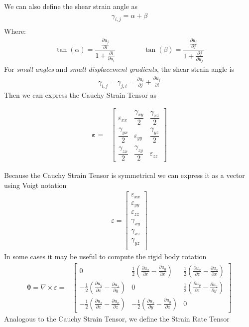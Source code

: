 \documentclass[a4paper, 11pt,article,oneside]{memoir}%
\begin{document}
We can also define the shear strain angle as
\begin{align*}
\gamma_{i,j}=\alpha+\beta\\
\end{align*} 
Where: 
\begin{align*}
\tan (\alpha)=\dfrac{\frac{\partial u_j}{\partial i}}{1+\frac{\partial i}{\partial u_i}}\qquad \qquad 
\tan (\beta)=\dfrac{\frac{\partial u_i}{\partial j}}{1+\frac{\partial j}{\partial u_j}}
\end{align*}
For \textit{small angles}
and \textit{small displacement gradients}, the shear strain angle is
\begin{align*}
\gamma_{i,j}=\gamma_{j,i}=\frac{\partial u_i}{\partial j}+\frac{\partial u_j}{\partial i}
\end{align*}
Then we can express the Cauchy Strain Tensor as
\begin{eqbox}
\begin{align*}
\boldsymbol{\varepsilon}=&\begin{bmatrix}
\varepsilon_{xx}&\dfrac{\gamma_{xy}}{2}&\dfrac{\gamma_{xz}}{2}\\
\dfrac{\gamma_{yx}}{2}&\varepsilon_{yy}&\dfrac{\gamma_{yz}}{2}\\
\dfrac{\gamma_{zx}}{2}&\dfrac{\gamma_{zy}}{2}&\varepsilon_{zz}
\end{bmatrix}
\end{align*}
\end{eqbox}
Because the Cauchy Strain Tensor is symmetrical we can express it as a vector using Voigt notation
\begin{align*}
\varepsilon=\begin{bmatrix}
\varepsilon_{xx}\\
\varepsilon_{yy}\\
\varepsilon_{zz}\\
\gamma_{xy}\\
\gamma_{xz}\\
\gamma_{yz}\\
\end{bmatrix}
\end{align*}
In some cases it may be useful to compute the rigid body rotation 
\begin{align*}\label{Rigid_body_rotation}
\boldsymbol{\theta}=\nabla\times\varepsilon=&\begin{bmatrix}
0&\frac{1}{2}\left(\frac{\partial u_x}{\partial x}-\frac{\partial u_y}{\partial x}\right)&\frac{1}{2}\left(\frac{\partial u_x}{\partial z}−\frac{\partial u_z}{\partial x}\right)\\
-\frac{1}{2}\left(\frac{\partial u_y}{\partial x}-\frac{\partial u_x}{\partial y}\right)&0&\frac{1}{2}\left(\frac{\partial u_y}{\partial z}-\frac{\partial u_z}{\partial y}\right)\\
-\frac{1}{2}\left(\frac{\partial u_z}{\partial x}-\frac{\partial u_x}{\partial z}\right)&-\frac{1}{2}\left(\frac{\partial u_z}{\partial y}-\frac{\partial u_y}{\partial z}\right)&0
\end{bmatrix}
\end{align*}
Analogous to the Cauchy Strain Tensor, we define the Strain Rate
Tensor
\end{document}

